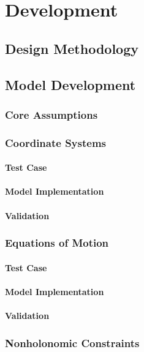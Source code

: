 \section{Development}
\subsection{Design Methodology}
\subsection{Model Development}
\subsubsection{Core Assumptions}
\subsubsection{Coordinate Systems}
\paragraph{Test Case}
\paragraph{Model Implementation}
\paragraph{Validation}
\subsubsection{Equations of Motion}
\paragraph{Test Case}
\paragraph{Model Implementation}
\paragraph{Validation}
\subsubsection{Nonholonomic Constraints}
